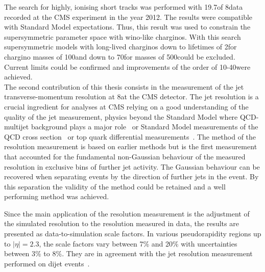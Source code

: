 The search for highly, ionising short tracks was performed with 19.7\fbinv of 8\tev data recorded at the CMS experiment in the year 2012.
The results were compatible with Standard Model expectations.
Thus, this result was used to constrain the supersymmetric parameter space with wino-like charginos.
With this search supersymmetric models with long-lived charginos down to lifetimes of 2\cm for chargino masses of 100\gev and down to 70\cm for masses of 500\gev could be excluded.
Current limits could be confirmed and improvements of the order of 10-40\gev were achieved.\\


The second contribution of this thesis consists in the measurement of the jet transverse-momentum resolution at 8\tev at the CMS detector.
The jet \pt resolution is a crucial ingredient for analyses at CMS relying on a good understanding of the quality of the jet \pt measurement, \eg physics beyond the Standard Model where QCD-multijet background plays a major role~\cite{bib:CMS:RA2_8TeV,bib:CMS:MT2_8TeV,bib:CMS:AlphaT_8TeV} or Standard Model measurements of the QCD cross section~\cite{bib:CMS:QCD_measurements} or top quark differential measurements~\cite{bib:CMS:TopCrossSection_8TeV}.
The method of the resolution measurement is based on earlier methods but is the first measurement that accounted for the fundamental non-Gaussian behaviour of the measured resolution in exclusive bins of further jet activity.
The Gaussian behaviour can be recovered when separating events by the direction of further jets in the event.
By this separation the validity of the method could be retained and a well performing method was achieved.

Since the main application of the resolution measurement is the adjustment of the simulated resolution to the resolution measured in data, the results are presented as data-to-simulation scale factors.
In various pseudorapidity regions up to $|\eta|=2.3$, the scale factors vary between 7\% and 20\% with uncertainties between 3\% to 8\%.
They are in agreement with the jet \pt resolution measurement performed on dijet events~\cite{bib:Kristin_Thesis}.\\

